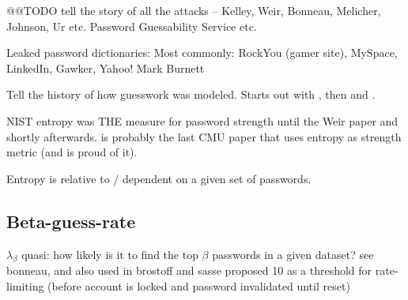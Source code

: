 	@@TODO tell the story of all the attacks -- Kelley, Weir, Bonneau, Melicher, Johnson, Ur etc. Password Guessability Service etc. 
	
	Leaked password dictionaries: Most commonly: RockYou (gamer site), MySpace, LinkedIn, Gawker, Yahoo!
	Mark Burnett  \cite{Burnett2005PerfectPasswords} 
	
	Tell the history of how guesswork was modeled. Starts out with \cite{Weir2010MetricsPolicies}, then \cite{Kelley20012GuessAgain} and \cite{Bonneau2012ScienceOfGuessing}. 
	
	NIST entropy was THE measure for password strength until the Weir paper and shortly afterwards. \cite{Komanduri2011OfPasswordsAndPeople} is probably the last CMU paper that uses entropy as strength metric (and is proud of it).
	
	Entropy is relative to / dependent on a given set of passwords. 
	
	\subsection{Beta-guess-rate}
	$\lambda_{\beta}$
	quasi: how likely is it to find the top $\beta$ passwords in a given dataset?
	see bonneau, and also used in \cite{Yang2016MnemonicSentenceBased}
	brostoff and sasse  proposed 10 as a threshold for rate-limiting (before account is locked and password invalidated until reset) \cite{Brostoff2003TenStrikes}
	
	
	
	

